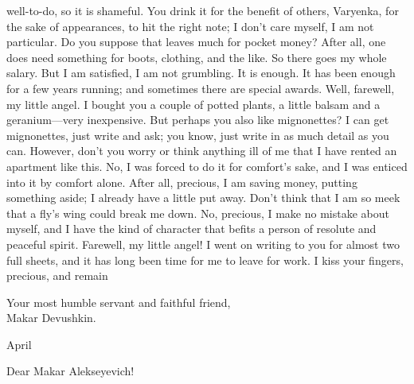 well-to-do, so it is shameful. You drink it for the benefit of others, Varyenka, for the sake of appearances, to hit the right note; I don't care myself, I am not particular. Do you suppose that leaves much for pocket money? After all, one does need something for boots, clothing, and the like. So there goes my whole salary. But I am satisfied, I am not grumbling. It is enough. It has been enough for a few years running; and sometimes there are special awards. Well, farewell, my little angel. I bought you a couple of potted plants, a little balsam and a geranium---very inexpensive. But perhaps you also like mignonettes? I can get mignonettes, just write and ask; you know, just write in as much detail as you can. However, don't you worry or think anything ill of me that I have rented an apartment like this. No, I was forced to do it for comfort's sake, and I was enticed into it by comfort alone. After all, precious, I am saving money, putting something aside; I already have a little put away. Don't think that I am so meek that a fly's wing could break me down. No, precious, I make no mistake about myself, and I have the kind of character that befits a person of resolute and peaceful spirit. Farewell, my little angel! I went on writing to you for almost two full sheets, and it has long been time for me to leave for work. I kiss your fingers, precious, and remain

\begin{flushright}
Your most humble servant and faithful friend,\\
	Makar Devushkin.
\end{flushright}

\begin{flushright}
	April 
\end{flushright}

\noindent Dear Makar Alekseyevich!

